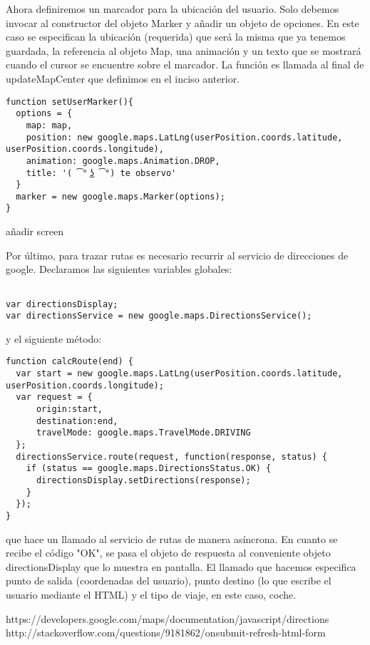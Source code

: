 Ahora definiremos un marcador para la ubicación del usuario. Solo debemos invocar al constructor del objeto Marker y añadir un objeto de opciones. En este caso se especifican la ubicación (requerida) que será la misma que ya tenemos guardada, la referencia al objeto Map, una animación y un texto que se mostrará cuando el cursor se encuentre sobre el marcador. La función es llamada al final de updateMapCenter que definimos en el inciso anterior.

\begin{lstlisting}
function setUserMarker(){
  options = {
    map: map,
    position: new google.maps.LatLng(userPosition.coords.latitude, userPosition.coords.longitude),
    animation: google.maps.Animation.DROP,
    title: '( ͡° ͜ʖ ͡°) te observo'
  }
  marker = new google.maps.Marker(options);
}
\end{lstlisting}

{{añadir screen}}

Por último, para trazar rutas es necesario recurrir al servicio de direcciones de google. Declaramos las siguientes variables globales:

\begin{lstlisting}

var directionsDisplay;
var directionsService = new google.maps.DirectionsService();

\end{lstlisting}

y el siguiente método:

\begin{lstlisting}
function calcRoute(end) {
  var start = new google.maps.LatLng(userPosition.coords.latitude, userPosition.coords.longitude);
  var request = {
      origin:start,
      destination:end,
      travelMode: google.maps.TravelMode.DRIVING
  };
  directionsService.route(request, function(response, status) {
    if (status == google.maps.DirectionsStatus.OK) {
      directionsDisplay.setDirections(response);
    }
  });
}
\end{lstlisting}

que hace un llamado al servicio de rutas de manera asíncrona. En cuanto se recibe el código "OK", se pasa el objeto de respuesta al conveniente objeto directionsDisplay que lo muestra en pantalla. El llamado que hacemos especifica punto de salida (coordenadas del usuario), punto destino (lo que escribe el usuario mediante el HTML) y el tipo de viaje, en este caso, coche.

https://developers.google.com/maps/documentation/javascript/directions
http://stackoverflow.com/questions/9181862/onsubmit-refresh-html-form